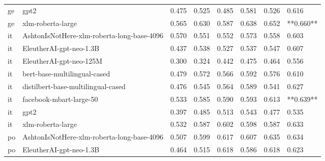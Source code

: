 \begin{tabular}{llllllll}
      ge &                                       gpt2 & 0.475 &                     0.525 &                 0.485 &                  0.581 &                                   0.526 &     0.616 \\
      ge &                          xlm-roberta-large & 0.565 &                     0.630 &                 0.587 &                  0.638 &                                   0.652 & **0.660** \\
      it & AshtonIsNotHere-xlm-roberta-long-base-4096 & 0.570 &                     0.551 &                 0.552 &                  0.573 &                                   0.558 &     0.603 \\
      it &                    EleutherAI-gpt-neo-1.3B & 0.437 &                     0.538 &                 0.527 &                  0.537 &                                   0.547 &     0.607 \\
      it &                    EleutherAI-gpt-neo-125M & 0.300 &                     0.324 &                 0.442 &                  0.475 &                                   0.464 &     0.556 \\
      it &               bert-base-multilingual-cased & 0.479 &                     0.572 &                 0.566 &                  0.592 &                                   0.576 &     0.610 \\
      it &         distilbert-base-multilingual-cased & 0.476 &                     0.545 &                 0.564 &                  0.589 &                                   0.541 &     0.627 \\
      it &                    facebook-mbart-large-50 & 0.533 &                     0.585 &                 0.590 &                  0.593 &                                   0.613 & **0.639** \\
      it &                                       gpt2 & 0.397 &                     0.485 &                 0.513 &                  0.543 &                                   0.477 &     0.535 \\
      it &                          xlm-roberta-large & 0.532 &                     0.587 &                 0.602 &                  0.598 &                                   0.587 &     0.633 \\
      po & AshtonIsNotHere-xlm-roberta-long-base-4096 & 0.507 &                     0.599 &                 0.617 &                  0.607 &                                   0.635 &     0.634 \\
      po &                    EleutherAI-gpt-neo-1.3B & 0.464 &                     0.515 &                 0.618 &                  0.586 &                                   0.618 &     0.623 \\

\end{tabular}
